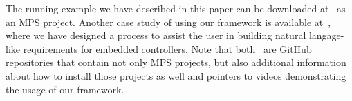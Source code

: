
The running example we have described in this paper can be downloaded
at~\cite{coolingControllerProcess} as an MPS project. Another case study of
using our framework is available at~\cite{earsctrlProcess}, where we have
designed a process to assist the user in building natural langage-like
requirements for embedded controllers. Note that
both~\cite{coolingControllerProcess,earsctrlProcess} are GitHub repositories
that contain not only MPS projects, but also additional information about how to
install those projects as well and pointers to videos demonstrating the usage of
our framework.
 \vspace{-.6cm}
  



